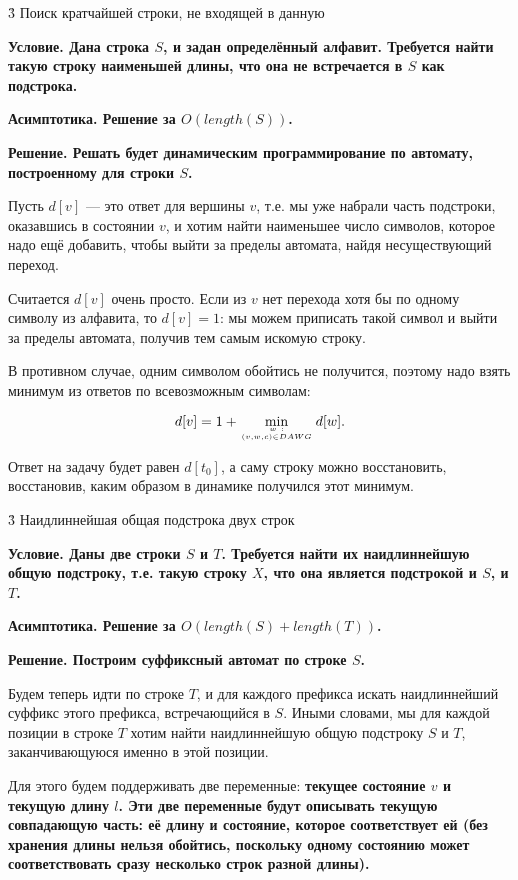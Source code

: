 \h3{ Поиск кратчайшей строки, не входящей в данную }

\bf{Условие}. Дана строка $S$, и задан определённый алфавит. Требуется найти такую строку наименьшей длины, что она не встречается в $S$ как подстрока.

\bf{Асимптотика}. Решение за $O (length (S))$.

\bf{Решение}. Решать будет динамическим программирование по автомату, построенному для строки $S$.

Пусть $d[v]$ --- это ответ для вершины $v$, т.е. мы уже набрали часть подстроки, оказавшись в состоянии $v$, и хотим найти наименьшее число символов, которое надо ещё добавить, чтобы выйти за пределы автомата, найдя несуществующий переход.

Считается $d[v]$ очень просто. Если из $v$ нет перехода хотя бы по одному символу из алфавита, то $d[v] = 1$: мы можем приписать такой символ и выйти за пределы автомата, получив тем самым искомую строку.

В противном случае, одним символом обойтись не получится, поэтому надо взять минимум из ответов по всевозможным символам:

$$ d[v] = 1 + \min_{w ~ : \atop (v,w,c) \in DAWG} d[w]. $$

Ответ на задачу будет равен $d[t_0]$, а саму строку можно восстановить, восстановив, каким образом в динамике получился этот минимум.


\h3{ Наидлиннейшая общая подстрока двух строк }

\bf{Условие}. Даны две строки $S$ и $T$. Требуется найти их наидлиннейшую общую подстроку, т.е. такую строку $X$, что она является подстрокой и $S$, и $T$.

\bf{Асимптотика}. Решение за $O (length(S) + length(T))$.

\bf{Решение}. Построим суффиксный автомат по строке $S$.

Будем теперь идти по строке $T$, и для каждого префикса искать наидлиннейший суффикс этого префикса, встречающийся в $S$. Иными словами, мы для каждой позиции в строке $T$ хотим найти наидлиннейшую общую подстроку $S$ и $T$, заканчивающуюся именно в этой позиции.

Для этого будем поддерживать две переменные: \bf{текущее состояние} $v$ и \bf{текущую длину} $l$. Эти две переменные будут описывать текущую совпадающую часть: её длину и состояние, которое соответствует ей (без хранения длины нельзя обойтись, поскольку одному состоянию может соответствовать сразу несколько строк разной длины).

